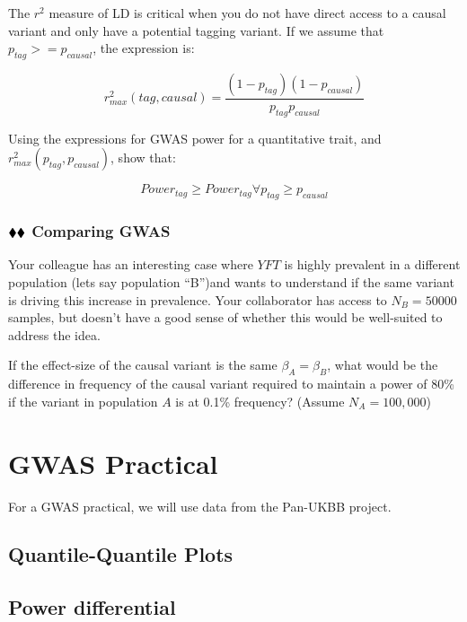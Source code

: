 \documentclass{pset}
\begin{document}
The $r^2$ measure of LD is critical when you do not have direct access to a causal variant and only have a potential tagging variant. If we assume that $p_{tag} >= p_{causal}$, the expression is: 

$$r^2_{max}(tag, causal) = \frac{(1 - p_{tag})(1 - p_{causal})}{p_{tag}p_{causal}}$$

Using the expressions for GWAS power for a quantitative trait, and $r^2_{max}(p_{tag}, p_{causal})$, show that:

$$Power_{tag} \geq Power_{tag} \forall p_{tag} \geq p_{causal}$$

\subsubsection*{$\mathbin{\blacklozenge}\mathbin{\blacklozenge}$ Comparing GWAS}

Your colleague has an interesting case where $YFT$ is highly prevalent in a different population (lets say population ``B'')and wants to understand if the same variant is driving this increase in prevalence. Your collaborator has access to $N_B=50000$ samples, but doesn't have a good sense of whether this would be well-suited to address the idea.

If the effect-size of the causal variant is the same $\beta_A = \beta_B$, what would be the difference in frequency of the causal variant required to maintain a power of 80\% if the variant in population $A$ is at 0.1\% frequency? (Assume $N_A = 100,000$)  


\section*{GWAS Practical}

For a GWAS practical, we will use data from the Pan-UKBB project. 

\subsection*{Quantile-Quantile Plots}



\subsection*{Power differential}



\subsection*{}
\end{document}
